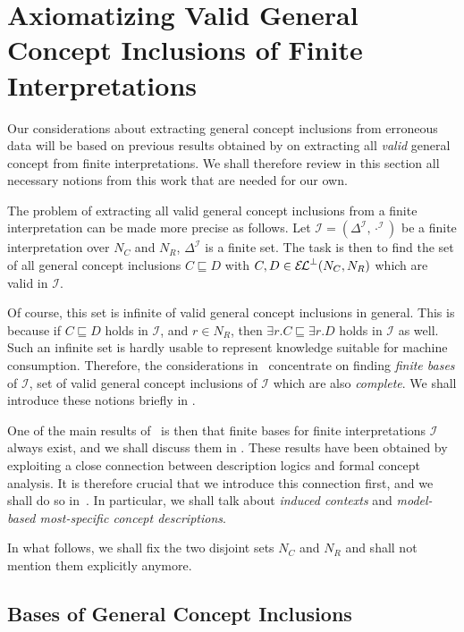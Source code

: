 \chapter{Axiomatizing Valid General Concept Inclusions of Finite
  Interpretations}
\label{cha:axiom-valid-el}

Our considerations about extracting general concept inclusions from erroneous data will be
based on previous results obtained by \textcite{Diss-Felix} on extracting all \emph{valid}
general concept from finite interpretations.  We shall therefore review in this section
all necessary notions from this work that are needed for our own.

The problem of extracting all valid general concept inclusions from a finite
interpretation can be made more precise as follows.  Let $\mathcal{I} =
(\Delta^{\mathcal{I}}, \cdot^{\mathcal{I}})$ be a finite interpretation over $N_C$ and
$N_R$, \ie $\Delta^{\mathcal{I}}$ is a finite set.  The task is then to find the set of
all general concept inclusions $C \sqsubseteq D$ with $C, D \in {\ensuremath{{\mathcal{E}\kern-.3ex\mathcal{L}}^\bot}}(N_C, N_R)$ which
are valid in $\mathcal{I}$.

Of course, this set is infinite of valid general concept inclusions in general.  This is
because if $C \sqsubseteq D$ holds in $\mathcal{I}$, and $r \in N_R$, then $\exists r. C
\sqsubseteq \exists r. D$ holds in $\mathcal{I}$ as well.  Such an infinite set is hardly
usable to represent knowledge suitable for machine consumption.  Therefore, the
considerations in~\cite{Diss-Felix} concentrate on finding \emph{finite bases} of
$\mathcal{I}$, \ie set of valid general concept inclusions of $\mathcal{I}$ which are also
\emph{complete}.  We shall introduce these notions briefly in .

One of the main results of~\cite{Diss-Felix} is then that finite bases for finite
interpretations $\mathcal{I}$ always exist, and we shall discuss them in
.  These results have been obtained by exploiting a close
connection between description logics and formal concept analysis.  It is therefore
crucial that we introduce this connection first, and we shall do so
in~.  In particular, we shall talk about \emph{induced contexts} and
\emph{model-based most-specific concept descriptions}.

In what follows, we shall fix the two disjoint sets $N_C$ and $N_R$ and shall not mention
them explicitly anymore.

\section{Bases of General Concept Inclusions}
\label{sec:bases-gener-conc}

